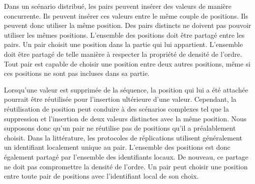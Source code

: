 Dans un scénario distribué, les pairs peuvent insérer des valeurs de manière concurrente.
Ils peuvent insérer ces valeurs entre le même couple de positions.
Ils peuvent donc utiliser la même position.
Des pairs distincts ne doivent pas pouvoir utiliser les mêmes positions.
L'ensemble des positions doit être partagé entre les pairs.
Un pair choisit une position dans la partie qui lui appartient.
L'ensemble doit être partagé de telle manière à respecter la propriété de densité de l'ordre.
Tout pair est capable de choisir une position entre deux autres positions, même si ces positions ne sont pas incluses dans sa partie.

Lorsqu'une valeur est supprimée de la séquence, la position qui lui a été attachée pourrait être réutilisée pour l'insertion ultérieure d'une valeur.
Cependant, la réutilisation de position peut conduire à des scénarios complexes tel que la suppression et l'insertion de deux valeurs distinctes avec la même position.
Nous supposons donc qu'un pair ne réutilise pas de positions qu'il a préalablement choisit.
Dans la littérature, les protocoles de réplications utilisent généralement un identifiant localement unique au pair.
L'ensemble des positions est donc également partagé par l'ensemble des identifiants locaux.
De nouveau, ce partage ne doit pas compromettre la densité de l'ordre.
Un pair peut choisir une position entre toute pair de positions avec l'identifiant local de son choix.


